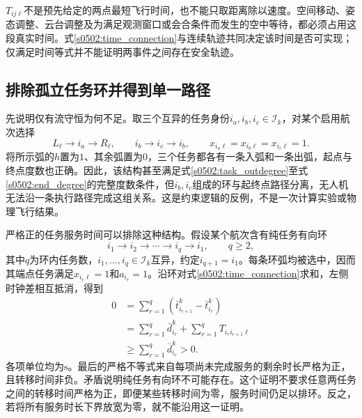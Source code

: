 $T_{ij\ell}$不是预先给定的两点最短飞行时间，也不能只取距离除以速度。空间移动、姿态调整、云台调整及为满足观测窗口或会合条件而发生的空中等待，都必须占用这段真实时间。式\eqref{s0502:time_connection}与连续轨迹共同决定该时间是否可实现；仅满足时间等式并不能证明两事件之间存在安全轨迹。

\subsection{排除孤立任务环并得到单一路径}

先说明仅有流守恒为何不足。取三个互异的任务身份$i_a,i_b,i_c\in\mathcal I_k$，对某个启用航次选择
\begin{equation}
 L_\ell\longrightarrow i_a\longrightarrow R_\ell,
 \qquad
 i_b\longrightarrow i_c\longrightarrow i_b,
 \qquad
 x_{i_a\ell}=x_{i_b\ell}=x_{i_c\ell}=1.
 \label{s0502:disconnected_cycle_example}
\end{equation}
将所示弧的$h$置为$1$、其余弧置为$0$，三个任务都各有一条入弧和一条出弧，起点与终点度数也正确。因此，该结构甚至满足式\eqref{s0502:task_outdegree}至式\eqref{s0502:end_degree}的完整度数条件，但$i_b,i_c$组成的环与起终点路径分离，无人机无法沿一条执行路径完成这组关系。这是约束逻辑的反例，不是一次计算实验或物理飞行结果。

严格正的任务服务时间可以排除这种结构。假设某个航次含有纯任务有向环
\begin{equation}
 i_1\longrightarrow i_2\longrightarrow\cdots
 \longrightarrow i_q\longrightarrow i_1,
 \qquad q\ge2,
 \label{s0502:hypothetical_cycle}
\end{equation}
其中$q$为环内任务数，$i_1,\ldots,i_q\in\mathcal I_k$互异，约定$i_{q+1}=i_1$。每条环弧均被选中，因而其端点任务满足$x_{i_r\ell}=1$和$a_{i_r}=1$。沿环对式\eqref{s0502:time_connection}求和，左侧时钟差相互抵消，得到
\begin{equation}
 \begin{split}
 0
 &=\sum_{r=1}^{q}(\bar t_{i_{r+1}}^k-\bar t_{i_r}^k)\\
 &=\sum_{r=1}^{q}\bar d_{i_r}^k
   +\sum_{r=1}^{q}T_{i_ri_{r+1}\ell}\\
 &\ge\sum_{r=1}^{q}\bar d_{i_r}^k>0.
 \end{split}
 \label{s0502:cycle_contradiction}
\end{equation}
各项单位均为$\mathrm{s}$。最后的严格不等式来自每项尚未完成服务的剩余时长严格为正，且转移时间非负。矛盾说明纯任务有向环不可能存在。这个证明不要求任意两任务之间的转移时间严格为正，即便某些转移时间为零，服务时间仍足以排环。反之，若将所有服务时长下界放宽为零，就不能沿用这一证明。

